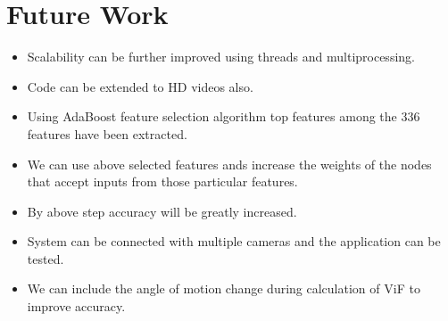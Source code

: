 \chapter{Future Work}
\begin{itemize}
	\item Scalability can be further improved using threads and multiprocessing.
	\item Code can be extended to HD videos also.
	\item Using AdaBoost feature selection algorithm top features among the 336 features have been extracted.
	\item We can use above selected features ands increase the weights of the nodes that accept inputs from those particular features.
	\item By above step accuracy will be greatly increased.
	\item System can be connected with multiple cameras and the application can be tested.
	\item We can include the angle of motion change during calculation of ViF to improve accuracy.
\end{itemize}